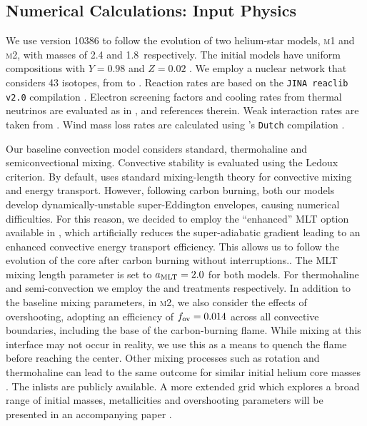 \documentclass[twocolumn,tighten,times]{aastex62}
\begin{document}
\subsection{Numerical Calculations: Input Physics}\label{sec:2.1}
We use \mesa version 10386 to follow the evolution of two helium-star models, \textsc{m1} and \textsc{m2}, with  masses of  2.4 and 1.8\msun\ respectively. 
The initial models have uniform compositions with $Y=0.98$ and $Z=0.02$ \citep[solar abundances are taken from ][]{grevesse1998}. We employ a nuclear network that considers 43  isotopes, from  to . Reaction rates are based on the \texttt{JINA reaclib v2.0} compilation \citep{cyburt2010}. Electron screening factors and cooling rates from thermal neutrinos are evaluated as in \cite{Farmer:2015afs}, and references therein. 
Weak interaction rates are taken from \cite{Suzuki:2015iry}. 
Wind mass loss rates are calculated using \mesa's \texttt{Dutch} compilation   \citep{Paxton:2013pj}. 

Our baseline convection model considers standard, thermohaline and semiconvectional mixing. Convective stability is 
evaluated using the Ledoux criterion. By default, \mesa uses  standard mixing-length theory  \citep[MTL;][]{cox1968} for convective mixing and energy transport. However, following carbon burning, both our models develop 
dynamically-unstable super-Eddington envelopes, causing numerical 
difficulties. For this reason, we decided to employ the ``enhanced'' MLT 
option available in \mesa \citep{Paxton:2013pj}, which artificially reduces 
the super-adiabatic gradient leading to  an enhanced convective energy 
transport efficiency.  This  allows us to follow the evolution of the core 
after carbon burning without interruptions.. 
The MLT mixing length parameter is set to $a_{\rm MLT}=2.0$ for both models. For thermohaline and semi-convection we employ the \cite{kippenhahn1980} and \cite{langer1983} treatments respectively. 
In addition to the baseline mixing parameters, in \textsc{m2}, we also 
consider the effects of overshooting, adopting an efficiency of $f_{\rm ov}=0.014$ across all convective boundaries, including the base of the 
carbon-burning flame. While mixing at this interface may not occur in reality, 
we use this as a means to  quench the flame before reaching the center.  
Other mixing processes such as rotation and thermohaline can lead to the 
same outcome for similar initial helium core masses \citep{Farmer:2015afs}.
The \mesa inlists are publicly available.
A more extended grid which explores a broad range of initial masses, 
metallicities and overshooting parameters will be presented in an 
accompanying paper \citep{chanlaridis2019}.       
\end{document}
